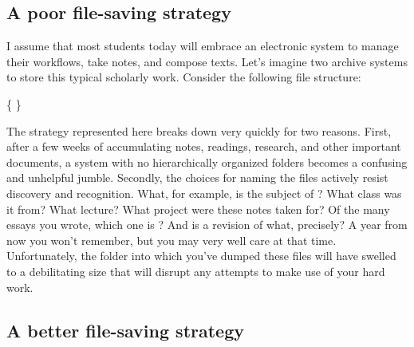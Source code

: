 \subsection{A poor file-saving strategy}

I assume that most students today will embrace an electronic system to manage their workflows, take notes, and compose texts. Let's imagine two archive systems to store this typical scholarly work. Consider the following file structure:

\medskip

{\large
{}  
}
 
\begin{center} \{  \} \end{center}

\noindent The strategy represented here breaks down very quickly for two reasons. First, after a few weeks of accumulating notes, readings, research, and other important documents, a system with no hierarchically organized folders becomes a confusing and unhelpful jumble. Secondly, the choices for naming the files actively resist discovery and recognition. What, for example, is the subject of ? What class was it from? What lecture? What project were these notes taken for? Of the many essays you wrote, which one is ? And  is a revision of what, precisely? A year from now you won't remember, but you may very well care at that time. Unfortunately, the folder into which you've dumped these files will have swelled to a debilitating size that will disrupt any attempts to make use of your hard work. 

\subsection{A better file-saving strategy}

